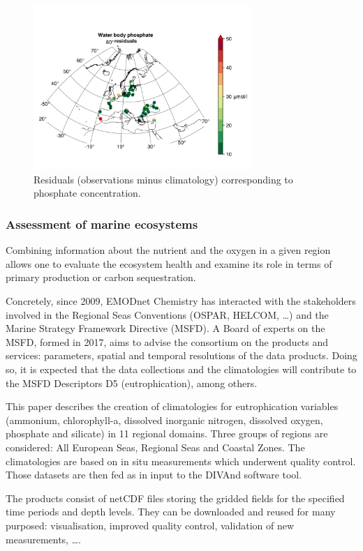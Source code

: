 \documentclass[essd, manuscript]{copernicus}
\begin{document}
\begin{figure}[t]
\includegraphics[width=8.3cm]{residuals_Water_body_phosphate.png}
\caption{Residuals (observations minus climatology) corresponding to phosphate concentration.\label{fig:residuals}}
\end{figure}

\subsubsection{Assessment of marine ecosystems}

Combining information about the nutrient and the oxygen in a given region allows one to evaluate the ecosystem health and examine its role in terms of primary production or carbon sequestration.

Concretely, since 2009, EMODnet Chemistry has interacted with the stakeholders involved in the Regional Seas Conventions (OSPAR, HELCOM, \ldots) and the Marine Strategy Framework Directive (MSFD). A Board of experts on the MSFD, formed in 2017, aims to advise the consortium on the products and services: parameters, spatial and temporal resolutions of the data products. Doing so, it is expected that the data collections and the climatologies will contribute to the MSFD Descriptors D5 (eutrophication), among others.

\conclusions  
This paper describes the creation of climatologies for eutrophication variables (ammonium, chlorophyll-a, dissolved inorganic nitrogen, dissolved oxygen, phosphate and silicate) in 11 regional domains. Three groups of regions are considered: All European Seas, Regional Seas and Coastal Zones. The climatologies are based on in situ measurements which underwent quality control. Those datasets are then fed as in input to the DIVAnd software tool. 

The products consist of netCDF files storing the gridded fields for the specified time periods and depth levels. They can be downloaded and reused for many purposed: visualisation, improved quality control, validation of new measurements, \ldots. 
\end{document}
